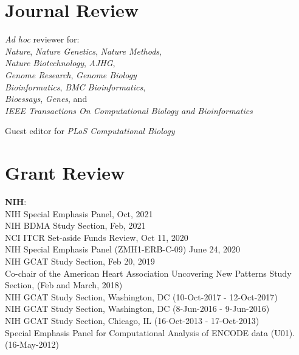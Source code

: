 \documentclass[margin,line]{cv}
\begin{document}
\begin{resume}
    \section{\mysidestyle Journal Review}
    \textit{Ad hoc} reviewer for:\\
        \textit{Nature}, \textit{Nature Genetics}, \textit{Nature Methods},\\
        \textit{Nature Biotechnology}, \textit{AJHG}, \\
        \textit{Genome Research}, \textit{Genome Biology}\\
	      \textit{Bioinformatics}, \textit{BMC Bioinformatics},\\
          \textit{Bioessays}, \textit{Genes}, and \\
        \textit{IEEE Transactions On Computational Biology and Bioinformatics}

    Guest editor for \textit{PLoS Computational Biology}

    \section{\mysidestyle Grant Review}
    \textbf{NIH}:\\
    NIH Special Emphasis Panel, Oct, 2021\\
    NIH BDMA Study Section, Feb, 2021\\
    NCI ITCR Set-aside Funds Review, Oct 11, 2020\\
    NIH Special Emphasis Panel (ZMH1-ERB-C-09) June 24, 2020\\
    NIH GCAT Study Section, Feb 20, 2019\\
    Co-chair of the American Heart Association Uncovering New Patterns Study Section, (Feb and March, 2018)\\
    NIH GCAT Study Section, Washington, DC (10-Oct-2017 - 12-Oct-2017)\\
    NIH GCAT Study Section, Washington, DC (8-Jun-2016 - 9-Jun-2016)\\
    NIH GCAT Study Section, Chicago, IL (16-Oct-2013 - 17-Oct-2013)\\
    Special Emphasis Panel for Computational Analysis of ENCODE data (U01). (16-May-2012)


\end{resume}
\end{document}
